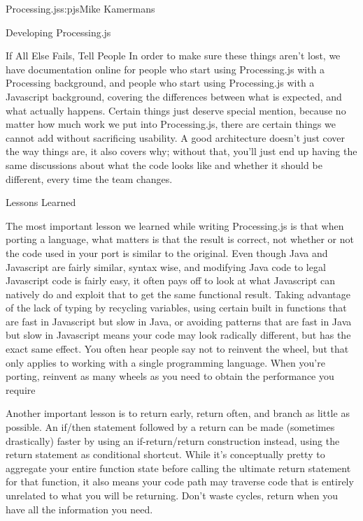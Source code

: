 \begin{aosachapter}{Processing.js}{s:pjs}{Mike Kamermans}
\begin{aosasect1}{Developing Processing.js}
\begin{aosasect2}{If All Else Fails, Tell People}
In order to make sure these things aren't lost, we have documentation
online for people who start using Processing.js with a Processing
background, and people who start using Processing.js with a Javascript
background, covering the differences between what is expected, and
what actually happens. Certain things just deserve special mention,
because no matter how much work we put into Processing.js, there are
certain things we cannot add without sacrificing usability. A good
architecture doesn't just cover the way things are, it also covers
why; without that, you'll just end up having the same discussions
about what the code looks like and whether it should be different,
every time the team changes.

\end{aosasect2}

\end{aosasect1}

\begin{aosasect1}{Lessons Learned}

The most important lesson we learned while writing Processing.js is
that when porting a language, what matters is that the result is
correct, not whether or not the code used in your port is similar to
the original. Even though Java and Javascript are fairly similar,
syntax wise, and modifying Java code to legal Javascript code is
fairly easy, it often pays off to look at what Javascript can natively
do and exploit that to get the same functional result. Taking
advantage of the lack of typing by recycling variables, using certain
built in functions that are fast in Javascript but slow in Java, or
avoiding patterns that are fast in Java but slow in Javascript means
your code may look radically different, but has the exact same
effect. You often hear people say not to reinvent the wheel, but that
only applies to working with a single programming language. When
you're porting, reinvent as many wheels as you need to obtain the
performance you require

Another important lesson is to return early, return often, and branch
as little as possible. An if/then statement followed by a return can
be made (sometimes drastically) faster by using an if-return/return
construction instead, using the return statement as conditional
shortcut. While it's conceptually pretty to aggregate your entire
function state before calling the ultimate return statement for that
function, it also means your code path may traverse code that is
entirely unrelated to what you will be returning. Don't waste cycles,
return when you have all the information you need.


\end{aosasect1}
\end{aosachapter}
